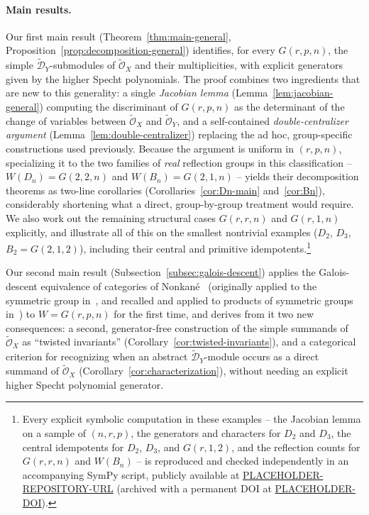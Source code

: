 \documentclass[11pt,a4paper]{article}
\begin{document}
\paragraph{Main results.} Our first main result
(Theorem~\ref{thm:main-general}, Proposition~\ref{prop:decomposition-general})
identifies, for every $G(r,p,n)$, the simple
$\widetilde{\mathcal{D}}_Y$-submodules of $\widetilde{\mathcal{O}}_X$
and their multiplicities, with explicit generators given by the
higher Specht polynomials. The proof combines two ingredients that are
new to this generality: a single \emph{Jacobian lemma}
(Lemma~\ref{lem:jacobian-general}) computing the discriminant of
$G(r,p,n)$ as the determinant of the change of variables between
$\widetilde{\mathcal{O}}_X$ and $\widetilde{\mathcal{O}}_Y$, and a
self-contained \emph{double-centralizer argument}
(Lemma~\ref{lem:double-centralizer}) replacing the ad hoc, group-specific
constructions used previously. Because the argument is uniform in
$(r,p,n)$, specializing it to the two families of \emph{real}
reflection groups in this classification -- $W(D_n) = G(2,2,n)$ and
$W(B_n) = G(2,1,n)$ -- yields their decomposition theorems as
two-line corollaries (Corollaries~\ref{cor:Dn-main}
and~\ref{cor:Bn}), considerably shortening what a direct,
group-by-group treatment would require. We also work out the
remaining structural cases $G(r,r,n)$ and $G(r,1,n)$ explicitly, and
illustrate all of this on the smallest nontrivial examples
($D_2$, $D_3$, $B_2=G(2,1,2)$), including their central and primitive
idempotents.\footnote{Every explicit symbolic computation in these
examples -- the Jacobian lemma on a sample of $(n,r,p)$, the
generators and characters for $D_2$ and $D_3$, the central idempotents
for $D_2$, $D_3$, and $G(r,1,2)$, and the reflection counts for
$G(r,r,n)$ and $W(B_n)$ -- is reproduced and checked independently in
an accompanying SymPy script, publicly available at
\url{PLACEHOLDER-REPOSITORY-URL} (archived with a permanent DOI at
\url{PLACEHOLDER-DOI}).}

Our second main result (Subsection~\ref{subsec:galois-descent}) applies
the Galois-descent equivalence of categories of
Nonkan\'e~\cite[\S 2.4]{Nonkane2019}
(originally applied to the symmetric group in~\cite{Nonkane2019}, and
recalled and applied to products of symmetric groups
in~\cite{NonkaneTodjihounde2023}) to $W = G(r,p,n)$ for
the first time, and derives from it two new consequences: a second,
generator-free construction of the simple summands of
$\widetilde{\mathcal{O}}_X$ as ``twisted invariants''
(Corollary~\ref{cor:twisted-invariants}), and a categorical criterion
for recognizing when an abstract $\widetilde{\mathcal{D}}_Y$-module
occurs as a direct summand of $\widetilde{\mathcal{O}}_X$
(Corollary~\ref{cor:characterization}), without needing an explicit
higher Specht polynomial generator.
\end{document}
